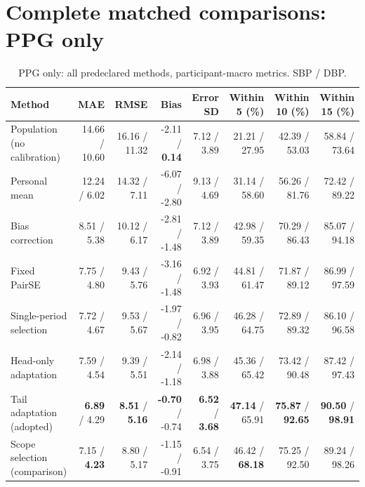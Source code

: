 \documentclass[conference]{IEEEtran}
\begin{document}
\section*{Complete matched comparisons: PPG only}
\begin{table}[!ht]\centering\scriptsize\caption{PPG only: all predeclared methods, participant-macro metrics. SBP / DBP.}
\begin{tabular}{lrrrrrrr}\toprule Method & MAE & RMSE & Bias & Error SD & Within 5 (\%) & Within 10 (\%) & Within 15 (\%)\\\midrule
Population (no calibration) & 14.66 / 10.60 & 16.16 / 11.32 & -2.11 / \textbf{0.14} & 7.12 / 3.89 & 21.21 / 27.95 & 42.39 / 53.03 & 58.84 / 73.64\\
Personal mean & 12.24 / 6.02 & 14.32 / 7.11 & -6.07 / -2.80 & 9.13 / 4.69 & 31.14 / 58.60 & 56.26 / 81.76 & 72.42 / 89.22\\
Bias correction & 8.51 / 5.38 & 10.12 / 6.17 & -2.81 / -1.48 & 7.12 / 3.89 & 42.98 / 59.35 & 70.29 / 86.43 & 85.07 / 94.18\\
Fixed PairSE & 7.75 / 4.80 & 9.43 / 5.76 & -3.16 / -1.48 & 6.92 / 3.93 & 44.81 / 61.47 & 71.87 / 89.12 & 86.99 / 97.59\\
Single-period selection & 7.72 / 4.67 & 9.53 / 5.67 & -1.97 / -0.82 & 6.96 / 3.95 & 46.28 / 64.75 & 72.89 / 89.32 & 86.10 / 96.58\\
Head-only adaptation & 7.59 / 4.54 & 9.39 / 5.51 & -2.14 / -1.18 & 6.98 / 3.88 & 45.36 / 65.42 & 73.42 / 90.48 & 87.42 / 97.43\\
Tail adaptation (adopted) & \textbf{6.89} / 4.29 & \textbf{8.51} / \textbf{5.16} & \textbf{-0.70} / -0.74 & \textbf{6.52} / \textbf{3.68} & \textbf{47.14} / 65.91 & \textbf{75.87} / \textbf{92.65} & \textbf{90.50} / \textbf{98.91}\\
Scope selection (comparison) & 7.15 / \textbf{4.23} & 8.80 / 5.17 & -1.15 / -0.91 & 6.54 / 3.75 & 46.42 / \textbf{68.18} & 75.25 / 92.50 & 89.24 / 98.26\\
\bottomrule\end{tabular}\end{table}
\end{document}
